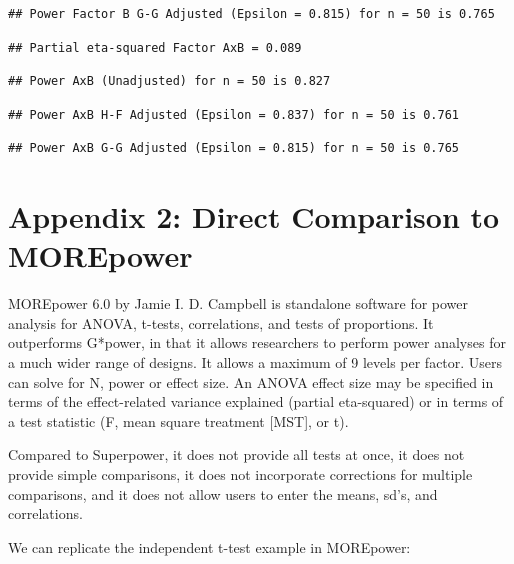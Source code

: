 \documentclass[]{book}
\begin{document}
\begin{verbatim}
## Power Factor B G-G Adjusted (Epsilon = 0.815) for n = 50 is 0.765
\end{verbatim}

\begin{verbatim}
## Partial eta-squared Factor AxB = 0.089
\end{verbatim}

\begin{verbatim}
## Power AxB (Unadjusted) for n = 50 is 0.827
\end{verbatim}

\begin{verbatim}
## Power AxB H-F Adjusted (Epsilon = 0.837) for n = 50 is 0.761
\end{verbatim}

\begin{verbatim}
## Power AxB G-G Adjusted (Epsilon = 0.815) for n = 50 is 0.765
\end{verbatim}

\hypertarget{appendix-2-direct-comparison-to-morepower}{%
\chapter*{Appendix 2: Direct Comparison to MOREpower}\label{appendix-2-direct-comparison-to-morepower}}

MOREpower 6.0 by Jamie I. D. Campbell is standalone software for power analysis for ANOVA, t-tests, correlations, and tests of proportions. It outperforms G*power, in that it allows researchers to perform power analyses for a much wider range of designs. It allows a maximum of 9 levels per factor. Users can solve for N, power or effect size. An ANOVA effect size may be specified in terms of the effect-related variance explained (partial eta-squared) or in terms of a test statistic (F, mean square treatment {[}MST{]}, or t).

Compared to Superpower, it does not provide all tests at once, it does not provide simple comparisons, it does not incorporate corrections for multiple comparisons, and it does not allow users to enter the means, sd's, and correlations.

We can replicate the independent t-test example in MOREpower:
\end{document}

